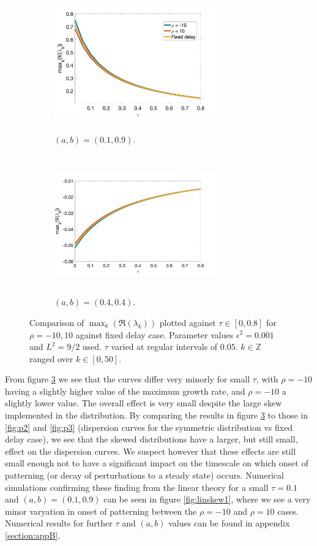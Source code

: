 \begin{figure}[H]
    \centering
    \begin{subfigure}[t]{0.45\textwidth}
        \centering
        \includegraphics[width=7cm,height=6cm]{dispskew.png}
        \caption{$(a,b)=(0.1,0.9)$.}
        \label{}
    \end{subfigure}
    \hfill
    \begin{subfigure}[t]{0.45\textwidth}
        \centering
        \includegraphics[width=7cm,height=6cm]{dispskew2.png}
        \caption{$(a,b)=(0.4,0.4)$.}
        \label{}
    \end{subfigure}
    \caption{Comparison of $\max_k(\Re(\lambda_k))$ plotted against $\tau\in[0,0.8]$ for $\rho=-10,10$ against fixed delay case. Parameter values $\epsilon^2=0.001$ and $L^2=9/2$ used. $\tau$ varied at regular intervals of $0.05$. $k\in\mathbb{Z}$ ranged over $k\in[0,50]$.}
    \label{fig:dispskew}
\end{figure}
From figure \ref{fig:dispskew} we see that the curves differ very minorly for small $\tau$, with $\rho=-10$ having a slightly higher value of the maximum growth rate, and $\rho=-10$ a slightly lower value. The overall effect is very small despite the large skew implemented in the distribution. By comparing the results in figure \ref{fig:dispskew} to those in \ref{fig:p2} and \ref{fig:p3} (dispersion curves for the symmetric distribution vs fixed delay case), we see that the skewed distributions have a larger, but still small, effect on the dispersion curves. We suspect however that these effects are still small enough not to have a significant impact on the timescale on which onset of patterning (or decay of perturbations to a steady state) occurs. Numerical simulations confirming these finding from the linear theory for a small $\tau=0.1$ and $(a,b)=(0.1,0.9)$ can be seen in figure \ref{fig:linskew1}, where we see a very minor varyation in onset of patterning between the $\rho=-10$ and $\rho=10$ cases. Numerical results for further $\tau$ and $(a,b)$ values can be found in appendix \ref{section:appB}.

